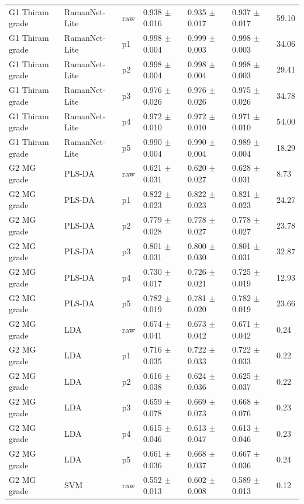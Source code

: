 {\begin{longtable}{L{2.35cm}L{2.4cm}L{1.0cm}L{2.35cm}L{2.25cm}L{2.25cm}L{1.45cm}}
G1 Thiram grade & RamanNet-Lite & raw & 0.938 $\pm$ 0.016 & 0.935 $\pm$ 0.017 & 0.937 $\pm$ 0.017 & 59.10 \\
G1 Thiram grade & RamanNet-Lite & p1 & 0.998 $\pm$ 0.004 & 0.999 $\pm$ 0.003 & 0.998 $\pm$ 0.003 & 34.06 \\
G1 Thiram grade & RamanNet-Lite & p2 & 0.998 $\pm$ 0.004 & 0.998 $\pm$ 0.004 & 0.998 $\pm$ 0.003 & 29.41 \\
G1 Thiram grade & RamanNet-Lite & p3 & 0.976 $\pm$ 0.026 & 0.976 $\pm$ 0.026 & 0.975 $\pm$ 0.026 & 34.78 \\
G1 Thiram grade & RamanNet-Lite & p4 & 0.972 $\pm$ 0.010 & 0.972 $\pm$ 0.010 & 0.971 $\pm$ 0.010 & 54.00 \\
G1 Thiram grade & RamanNet-Lite & p5 & 0.990 $\pm$ 0.004 & 0.990 $\pm$ 0.004 & 0.989 $\pm$ 0.004 & 18.29 \\
G2 MG grade & PLS-DA & raw & 0.621 $\pm$ 0.031 & 0.620 $\pm$ 0.027 & 0.628 $\pm$ 0.031 & 8.73 \\
G2 MG grade & PLS-DA & p1 & 0.822 $\pm$ 0.023 & 0.822 $\pm$ 0.023 & 0.821 $\pm$ 0.023 & 24.27 \\
G2 MG grade & PLS-DA & p2 & 0.779 $\pm$ 0.028 & 0.778 $\pm$ 0.027 & 0.778 $\pm$ 0.027 & 23.78 \\
G2 MG grade & PLS-DA & p3 & 0.801 $\pm$ 0.031 & 0.800 $\pm$ 0.030 & 0.801 $\pm$ 0.031 & 32.87 \\
G2 MG grade & PLS-DA & p4 & 0.730 $\pm$ 0.017 & 0.726 $\pm$ 0.021 & 0.725 $\pm$ 0.019 & 12.93 \\
G2 MG grade & PLS-DA & p5 & 0.782 $\pm$ 0.019 & 0.781 $\pm$ 0.020 & 0.782 $\pm$ 0.019 & 23.66 \\
G2 MG grade & LDA & raw & 0.674 $\pm$ 0.041 & 0.673 $\pm$ 0.042 & 0.671 $\pm$ 0.042 & 0.24 \\
G2 MG grade & LDA & p1 & 0.716 $\pm$ 0.035 & 0.722 $\pm$ 0.033 & 0.722 $\pm$ 0.033 & 0.22 \\
G2 MG grade & LDA & p2 & 0.616 $\pm$ 0.038 & 0.624 $\pm$ 0.036 & 0.625 $\pm$ 0.037 & 0.22 \\
G2 MG grade & LDA & p3 & 0.659 $\pm$ 0.078 & 0.669 $\pm$ 0.073 & 0.668 $\pm$ 0.076 & 0.23 \\
G2 MG grade & LDA & p4 & 0.615 $\pm$ 0.046 & 0.613 $\pm$ 0.047 & 0.613 $\pm$ 0.046 & 0.23 \\
G2 MG grade & LDA & p5 & 0.661 $\pm$ 0.036 & 0.668 $\pm$ 0.037 & 0.667 $\pm$ 0.036 & 0.24 \\
G2 MG grade & SVM & raw & 0.552 $\pm$ 0.013 & 0.602 $\pm$ 0.008 & 0.589 $\pm$ 0.013 & 0.12 \\

\end{longtable}}
